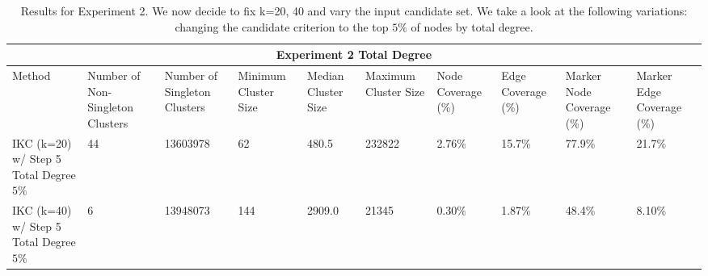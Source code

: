 \documentclass{article}
\begin{document}
\begin{table}[h!]
	\centering
	\begin{small}
		\begin{tabular}{ |p{0.95cm}||p{1.25cm}|p{1.25cm}||p{1.20cm}|p{1.20cm}|p{1.20cm}||p{1.25cm}|p{1.25cm}|| p{1.25cm}|p{1.25cm}| }
			\hline
			\multicolumn{10}{|c|}{Experiment 2 Total Degree} \\
			\hline
			Method & Number of Non-Singleton Clusters & Number of Singleton Clusters & Minimum Cluster Size &  Median Cluster Size & Maximum Cluster Size & Node Coverage (\%)& Edge Coverage  (\%)& Marker Node Coverage  (\%)& Marker Edge Coverage  (\%)\\
			\hline
			IKC (k=20)  w/ Step 5 Total Degree $5\%$&  44    & \cellcolor{blue!20}13603978 &   \cellcolor{red!20}62 & \cellcolor{red!20}480.5 & \cellcolor{red!20}232822 &\cellcolor{red!20}2.76\% & \cellcolor{red!20}15.7\% & \cellcolor{red!20}77.9\% & \cellcolor{red!20}21.7\%  \\ \hline
			
			IKC (k=40)  w/ Step 5 Total Degree $5\%$ &  6    & \cellcolor{blue!20}13948073 &   \cellcolor{red!20}144 & \cellcolor{red!20}2909.0 & \cellcolor{red!20}21345 & \cellcolor{red!20}0.30\% & \cellcolor{red!20}1.87\% & \cellcolor{red!20}48.4\% & \cellcolor{red!20}8.10\% \\
			\hline
			\hline
		\end{tabular}
	\end{small}
	\caption{Results for Experiment 2. We now decide to fix k=20, 40 and vary the input candidate set. We take a look at the following variations:  changing the candidate criterion to the  top $5\%$ of nodes by total degree.}
	\label{table:expt2totaldegree}
\end{table}
\end{document}
